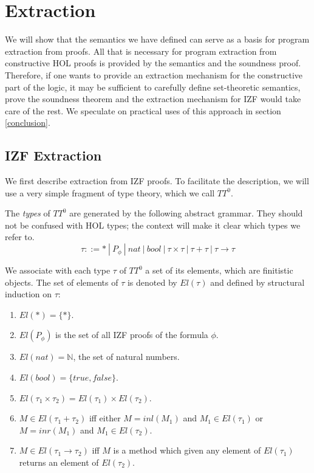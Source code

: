 \documentclass{LMCS}
\newcommand{\nat}{\ensuremath{\mathbb{N}}}
\newcommand{\ST}{*}
\newcommand{\st}{*}
\begin{document}
\section{Extraction}\label{extraction}

We will show that the semantics we have defined can serve as a basis for
program extraction from proofs. All that is necessary for program extraction
from constructive HOL proofs is provided by the semantics and the soundness
proof. Therefore, if one wants to provide an extraction mechanism for the
constructive part of the logic, it may be sufficient to carefully define set-theoretic semantics,
prove the soundness theorem and the extraction mechanism for IZF would take
care of the rest. We speculate on practical uses of this approach in section
\ref{conclusion}. 



\subsection{IZF Extraction}

We first describe extraction from IZF proofs. To facilitate the description,
we will use a very simple fragment of type theory, which we call $TT^0$. 

The \emph{types} of $TT^0$ are generated by the following abstract grammar.
They should not be confused with HOL types; the context will make it clear
which types we refer to. 
\[
\tau ::= \ST\ |\ P_\phi\ |\ nat\ |\ bool\ |\ \tau \times \tau\ |\ \tau + \tau\ |\ \tau \to \tau
\]

We associate with each type $\tau$ of $TT^0$ a set of its elements, which are
finitistic objects. The set of elements of $\tau$ is denoted by $El(\tau)$
and defined by structural induction on $\tau$:

\begin{enumerate}[$\bullet$]
\item $El(\ST) = \{ \st \}$.
\item $El(P_\phi)$ is the set of all IZF proofs of the formula $\phi$.
\item $El(nat) = \nat$, the set of natural numbers.
\item $El(bool) = \{ true, false \}$.
\item $El(\tau_1 \times \tau_2) = El(\tau_1) \times El(\tau_2)$.
\item $M \in El(\tau_1 + \tau_2)$ iff either $M = inl(M_1)$ and $M_1 \in
El(\tau_1)$ or $M = inr(M_1)$ and $M_1 \in El(\tau_2)$.
\item $M \in El(\tau_1 \to \tau_2)$ iff $M$ is a method which given any
element of $El(\tau_1)$ returns an element of $El(\tau_2)$.
\end{enumerate}
\end{document}
